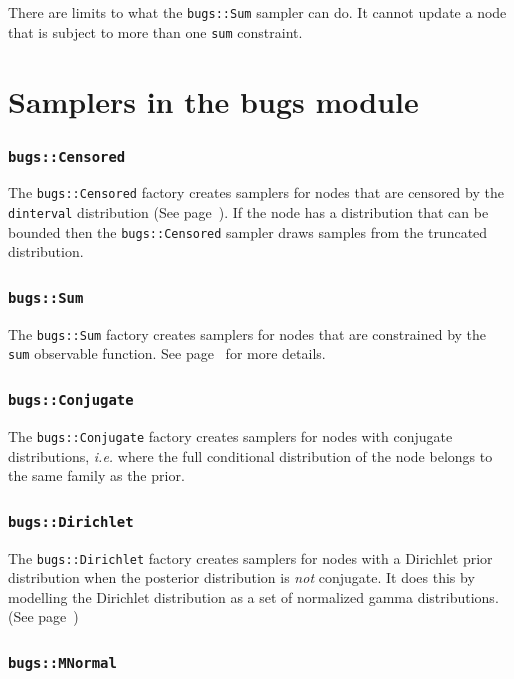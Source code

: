 \documentclass[11pt, a4paper, titlepage]{report}
\begin{document}
There are limits to what the \texttt{bugs::Sum} sampler can do. It
cannot update a node that is subject to more than one \texttt{sum}
constraint.

\section{Samplers in the bugs module}


\subsubsection{\texttt{bugs::Censored}}

The \texttt{bugs::Censored} factory creates samplers for nodes that
are censored by the \texttt{dinterval} distribution (See
page~\pageref{bugs:dinterval}). If the node has a distribution that can be
bounded then the \texttt{bugs::Censored} sampler draws samples from
the truncated distribution.

\subsubsection{\texttt{bugs::Sum}}

The \texttt{bugs::Sum} factory creates samplers for nodes that are
constrained by the \texttt{sum} observable function. See
page~\pageref{bugs:sum} for more details.

\subsubsection{\texttt{bugs::Conjugate}}

The \texttt{bugs::Conjugate} factory creates samplers for nodes with
conjugate distributions, {\em i.e.} where the full conditional
distribution of the node belongs to the same family as the prior.

\subsubsection{\texttt{bugs::Dirichlet}}

The \texttt{bugs::Dirichlet} factory creates samplers for nodes with a
Dirichlet prior distribution when the posterior distribution is {\em
  not} conjugate. It does this by modelling the Dirichlet distribution
as a set of normalized gamma distributions. (See page~\pageref{bugs:ddirch})

\subsubsection{\texttt{bugs::MNormal}}
\end{document}

